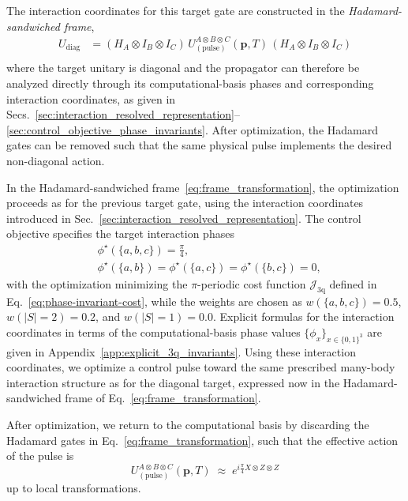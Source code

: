 \noindent
The interaction coordinates for this target gate are constructed in the \emph{Hadamard-sandwiched frame},
\begin{equation}
\label{eq:frame_transformation}
\begin{aligned}
U_{\mathrm{diag}} &= (H_A\!\otimes\!I_B\!\otimes\!I_C)\,
U^{A\otimes B\otimes C}_{(\mathrm{pulse})}(\mathbf p,T)\,
(H_A\!\otimes\!I_B\!\otimes\!I_C) \\
\end{aligned}
\end{equation}
where the target unitary is diagonal and the propagator can therefore be analyzed directly through its computational-basis phases and corresponding interaction coordinates, as given in Secs.~\ref{sec:interaction_resolved_representation}–\ref{sec:control_objective_phase_invariants}. After optimization, the Hadamard gates can be removed such that the same physical pulse implements the desired non-diagonal action.


\medskip
\noindent
In the Hadamard-sandwiched frame~\eqref{eq:frame_transformation}, the optimization proceeds as for the previous target gate, using the interaction coordinates introduced in Sec.~\ref{sec:interaction_resolved_representation}. The control objective specifies the target interaction phases
\begin{equation}
\begin{aligned}
&\phi^\star(\{a,b,c\}) = \tfrac{\pi}{4}, \\
&\phi^\star(\{a,b\})
=
\phi^\star(\{a,c\})
=
\phi^\star(\{b,c\})
= 0,
\end{aligned}
\label{eq:Uxzzinvariants}
\end{equation}
with the optimization minimizing the $\pi$-periodic cost function $\mathcal{J}_{\mathrm{3q}}$ defined in Eq.~\eqref{eq:phase-invariant-cost}, while the weights are chosen as $w(\{{a,b,c}\})=0.5$, $w(|S|=2)=0.2$, and $w(|S|=1)=0.0$. Explicit formulas for the interaction coordinates in terms of the computational-basis phase values $\{\phi_x\}_{x\in\{0,1\}^3}$ are given in Appendix~\ref{app:explicit_3q_invariants}. Using these interaction coordinates, we optimize a control pulse toward the same prescribed many-body interaction structure as for the diagonal target, expressed now in the Hadamard-sandwiched frame of Eq.~\eqref{eq:frame_transformation}.



\medskip
\noindent
After optimization, we return to the computational basis by discarding the Hadamard gates in Eq.~\eqref{eq:frame_transformation}, such that the effective action of the pulse is
\begin{equation}
U^{A\otimes B\otimes C}_{(\mathrm{pulse})}(\mathbf p,T)
\;\approx\;
e^{i\frac{\pi}{4}X\!\otimes\!Z\!\otimes\!Z}
\end{equation}
up to local transformations.

